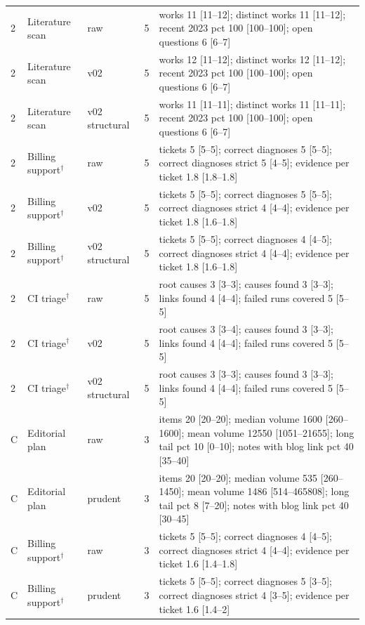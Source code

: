 \begin{longtable}{lllrp{8.0cm}}
2 & Literature scan & raw & 5 & works 11 [11--12]; distinct works 11 [11--12]; recent 2023 pct 100 [100--100]; open questions 6 [6--7] \\
2 & Literature scan & v02 & 5 & works 12 [11--12]; distinct works 12 [11--12]; recent 2023 pct 100 [100--100]; open questions 6 [6--7] \\
2 & Literature scan & v02 structural & 5 & works 11 [11--11]; distinct works 11 [11--11]; recent 2023 pct 100 [100--100]; open questions 6 [6--7] \\
2 & Billing support$^\dagger$ & raw & 5 & tickets 5 [5--5]; correct diagnoses 5 [5--5]; correct diagnoses strict 5 [4--5]; evidence per ticket 1.8 [1.8--1.8] \\
2 & Billing support$^\dagger$ & v02 & 5 & tickets 5 [5--5]; correct diagnoses 5 [5--5]; correct diagnoses strict 4 [4--4]; evidence per ticket 1.8 [1.6--1.8] \\
2 & Billing support$^\dagger$ & v02 structural & 5 & tickets 5 [5--5]; correct diagnoses 4 [4--5]; correct diagnoses strict 4 [4--4]; evidence per ticket 1.8 [1.6--1.8] \\
2 & CI triage$^\dagger$ & raw & 5 & root causes 3 [3--3]; causes found 3 [3--3]; links found 4 [4--4]; failed runs covered 5 [5--5] \\
2 & CI triage$^\dagger$ & v02 & 5 & root causes 3 [3--4]; causes found 3 [3--3]; links found 4 [4--4]; failed runs covered 5 [5--5] \\
2 & CI triage$^\dagger$ & v02 structural & 5 & root causes 3 [3--3]; causes found 3 [3--3]; links found 4 [4--4]; failed runs covered 5 [5--5] \\
C & Editorial plan & raw & 3 & items 20 [20--20]; median volume 1600 [260--1600]; mean volume 12550 [1051--21655]; long tail pct 10 [0--10]; notes with blog link pct 40 [35--40] \\
C & Editorial plan & prudent & 3 & items 20 [20--20]; median volume 535 [260--1450]; mean volume 1486 [514--465808]; long tail pct 8 [7--20]; notes with blog link pct 40 [30--45] \\
C & Billing support$^\dagger$ & raw & 3 & tickets 5 [5--5]; correct diagnoses 4 [4--5]; correct diagnoses strict 4 [4--4]; evidence per ticket 1.6 [1.4--1.8] \\
C & Billing support$^\dagger$ & prudent & 3 & tickets 5 [5--5]; correct diagnoses 5 [3--5]; correct diagnoses strict 4 [3--5]; evidence per ticket 1.6 [1.4--2] \\
\bottomrule
\end{longtable}
